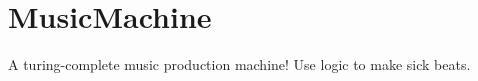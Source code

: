 \chapter{Music\+Machine }
\hypertarget{md__r_e_a_d_m_e}{}\label{md__r_e_a_d_m_e}
\label{md__r_e_a_d_m_e_autotoc_md0}%
%


A turing-\/complete music production machine! Use logic to make sick beats. 